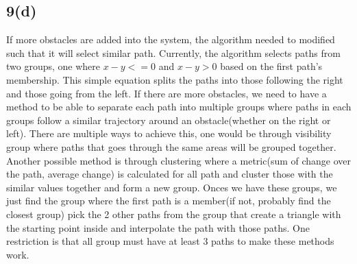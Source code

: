\documentclass{article}
\begin{document}
\subsection*{9(d)}
If more obstacles are added into the system, the algorithm needed to modified such that it will select similar path. Currently, the algorithm selects paths from two groups, one where $x - y <= 0$ and $x - y > 0$ based on the first path's membership. This simple equation splits the paths into those following the right and those going from the left. If there are more obstacles, we need to have a method to be able to separate each path into multiple groups where paths in each groups follow a similar trajectory around an obstacle(whether on the right or left). There are multiple ways to achieve this, one would be through visibility group where paths that goes through the same areas will be grouped together. Another possible method is through clustering where a metric(sum of change over the path, average change) is calculated for all path and cluster those with the similar values together and form a new group. Onces we have these groups, we just find the group where the first path is a member(if not, probably find the closest group) pick the 2 other paths from the group that create a triangle with the starting point inside and interpolate the path with those paths. One restriction is that all group must have at least 3 paths to make these methods work.
\end{document}
